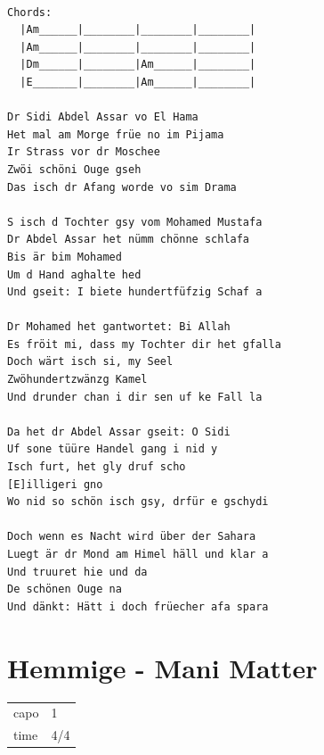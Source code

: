 \documentclass[
]{book}
\let\stdsection\section
\renewcommand\section{\clearpage\stdsection}
\begin{document}
\begin{verbatim}

Chords:
  |Am______|________|________|________|
  |Am______|________|________|________|
  |Dm______|________|Am______|________|
  |E_______|________|Am______|________|

Dr Sidi Abdel Assar vo El Hama
Het mal am Morge früe no im Pijama
Ir Strass vor dr Moschee
Zwöi schöni Ouge gseh
Das isch dr Afang worde vo sim Drama

S isch d Tochter gsy vom Mohamed Mustafa
Dr Abdel Assar het nümm chönne schlafa
Bis är bim Mohamed
Um d Hand aghalte hed
Und gseit: I biete hundertfüfzig Schaf a

Dr Mohamed het gantwortet: Bi Allah
Es fröit mi, dass my Tochter dir het gfalla
Doch wärt isch si, my Seel
Zwöhundertzwänzg Kamel
Und drunder chan i dir sen uf ke Fall la

Da het dr Abdel Assar gseit: O Sidi
Uf sone tüüre Handel gang i nid y
Isch furt, het gly druf scho
[E]illigeri gno
Wo nid so schön isch gsy, drfür e gschydi

Doch wenn es Nacht wird über der Sahara
Luegt är dr Mond am Himel häll und klar a
Und truuret hie und da
De schönen Ouge na
Und dänkt: Hätt i doch früecher afa spara
\end{verbatim}

\hypertarget{hemmige---mani-matter}{%
\section{Hemmige - Mani Matter}\label{hemmige---mani-matter}}

\begin{longtable}[]{@{}ll@{}}
\toprule
\endhead
capo & 1\tabularnewline
time & 4/4\tabularnewline
\bottomrule
\end{longtable}
\end{document}
